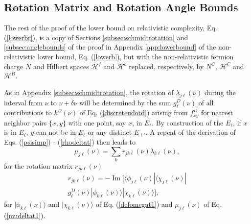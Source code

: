 \documentclass[twocolumn,amsmath,amssymb]{revtex4-1}
\begin{document}
\subsection{\label{subsec:rest} Rotation Matrix and Rotation Angle Bounds}

The rest of the proof of the lower bound
on relativistic complexity, Eq. (\ref{lowerbr}),
is a copy of
Sections \ref{subsec:schmidtrotation} and \ref{subsec:anglebounds}
of the proof in Appendix \ref{app:lowerbound}
of the non-relativistic lower bound, Eq. (\ref{lowerb}), 
but with the non-relativistic fermion charge $N$ and
Hilbert spaces $\mathcal{H}^f$ and $\mathcal{H}^b$ replaced,
respectively, by $N^C$, $\mathcal{H}^C$ and $\mathcal{H}^B$.

As in Appendix \ref{subsec:schmidtrotation}, the rotation of
$\lambda_{j \ell}(\nu)$ during the interval from $\nu$ to $\nu + \delta \nu$
will be determined by the sum $g^D_{\ell}(\nu)$ of all contributions to $k^D(\nu)$
of Eq. (\ref{discreteudotd})
arising from $f^D_{xy}$ for nearest neighbor pairs $\{x,y\}$ with
one point, say $x$, in $E_\ell$. By construction of
the $E_\ell$, if $x$ is in $E_\ell$, $y$ can not be
in $E_\ell$ or any distinct $E_{\ell'}$.
A repeat of the derivation of Eqs. (\ref{psisimp}) - (\ref{rhodeltat}) 
then leads to
\begin{equation}
\label{ufromperturb1}
\mu_{j\ell}(\nu) = \sum_k r_{jk\ell}(\nu) \lambda_{k\ell}(\nu), 
\end{equation}
for the rotation matrix $r_{jk\ell}(\nu)$
\begin{multline}
\label{rijp1}
r_{jk\ell}(\nu) = 
 -\operatorname{Im}[  \langle \phi_{j\ell}(\nu)| \langle \chi_{j\ell}(\nu)| \\
g^D_{\ell}(\nu)|\phi_{k\ell}(\nu) \rangle |\chi_{k\ell}(\nu) \rangle ],
\end{multline}
for $|\phi_{k\ell}(\nu) \rangle $ and $|\chi_{k\ell}(\nu) \rangle $ of Eq. (\ref{defomegat1})
and $\mu_{j\ell}(\nu)$ of Eq. (\ref{mudeltat1}).
\end{document}
